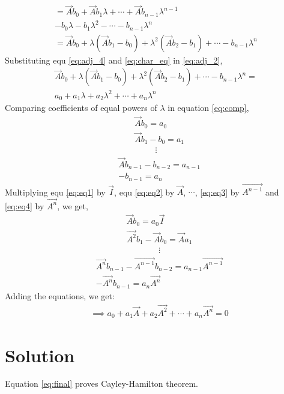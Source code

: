 \documentclass[journal,12pt,twocolumn]{IEEEtran}
\begin{document}
\begin{multline}
= \vec{A}b_0 + \vec{A}b_1\lambda +\cdots+ \vec{A}b_{n-1}\lambda^{n-1}\\
- b_0\lambda - b_1\lambda^{2}-\cdots - b_{n-1}\lambda^{n}\\
=\vec{A}b_0 + \lambda(\vec{A}b_1 - b_0) + \lambda^{2}(\vec{A}b_2 - b_1) + \cdots - b_{n-1}\lambda^{n}  \label{eq:adj_4}
\end{multline}
Substituting equ \eqref{eq:adj_4} and \eqref{eq:char_eq}  in \eqref{eq:adj_2},
\begin{multline} \label{eq:comp}
\vec{A}b_0 + \lambda(\vec{A}b_1 - b_0) + \lambda^{2}(\vec{A}b_2 - b_1) + \cdots - b_{n-1}\lambda^{n} =\\
a_0 + a_1\lambda + a_2\lambda^{2} +  \cdots+a_n\lambda^{n}
\end{multline}
Comparing coefficients of equal powers of $\lambda$ in equation \eqref{eq:comp},
\begin{align}
& \vec{A}b_0 = a_0 \label{eq:eq1}\\
& \vec{A}b_1 - b_0 = a_1 \label{eq:eq2}
\end{align}
\begin{align*}
 \vdots
\end{align*}
\begin{align}
& \vec{A}b_{n-1} - b_{n-2} = a_{n-1} \label{eq:eq3}\\
& -b_{n-1} = a_n \label{eq:eq4}
\end{align}
Multiplying equ \eqref{eq:eq1} by $\vec{I}$, equ \eqref{eq:eq2} by $\vec{A}$, $\cdots$,  \eqref{eq:eq3} by $\vec{A^{n-1}}$ and  \eqref{eq:eq4} by $\vec{A^{n}}$, we get,
\begin{align}
& \vec{A}b_0 = a_0\vec{I} \label{eq:eq5}\\
& \vec{A^{2}}b_1 - \vec{A}b_0 = \vec{A}a_1 \label{eq:eq6}
\end{align}
\begin{align*}
& \vdots
\end{align*}
\begin{align}
& \vec{A^{n}}b_{n-1} - \vec{A^{n-1}}b_{n-2} = a_{n-1}\vec{A^{n-1}} \label{eq:eq7}\\
& -\vec{A^{n}}b_{n-1} = a_n\vec{A^{n}} \label{eq:eq8}
\end{align}
Adding the equations, we get:
\begin{align}
&\implies \boxed{a_0 + a_1\vec{A} + a_2\vec{A^{2}} +  \cdots+a_n\vec{A^{n}} = 0} \label{eq:final}
\end{align}
\section{Solution}

Equation \eqref{eq:final} proves Cayley-Hamilton theorem.
\\
\end{document}
